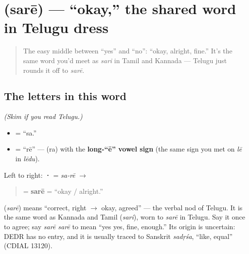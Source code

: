 \section[\texorpdfstring{\te{సరే} (sarē)}{సరే (sarē)}]{ (sarē) — \textquotedblleft{}okay,\textquotedblright{} the shared word in Telugu dress}

\label{lesson:TE-C01-sare}



\begin{quote}
The easy middle between \textquotedblleft{}yes\textquotedblright{} and \textquotedblleft{}no\textquotedblright{}: \textquotedblleft{}okay, alright, fine.\textquotedblright{} It's the same word you'd meet as \emph{sari} in Tamil and Kannada — Telugu just rounds it off to \emph{sarē}.
\end{quote}

\subsection*{The letters in this word}
\emph{(Skim if you read Telugu.)}

\begin{itemize}
\raggedright
  \item \textbf{} = \textquotedblleft{}sa.\textquotedblright{}
  \item \textbf{} = \textquotedblleft{}rē\textquotedblright{} — \textbf{} (ra) with the \textbf{long-\textquotedblleft{}ē\textquotedblright{} vowel sign} (the same sign you met on \emph{lē} in \emph{lēdu}).
\end{itemize}

Left to right: \textbf{ · } = \emph{sa-rē} $\to$

\begin{quote}
\textbf{} = \textbf{sarē} = \textquotedblleft{}okay / alright.\textquotedblright{}
\end{quote}

\begin{cousinweb}
\textbf{} (\emph{sarē}) means \textquotedblleft{}correct, right $\to$ okay, agreed\textquotedblright{} — the verbal nod of Telugu. It is the same word as Kannada \textbf{} and Tamil \textbf{} (\emph{sari}), worn to \emph{sarē} in Telugu. Say it once to agree; say \emph{sarē sarē} to mean \textquotedblleft{}yes yes, fine, enough.\textquotedblright{} Its origin is uncertain: DEDR has no entry, and it is usually traced to Sanskrit \emph{sadṛśa}, \textquotedblleft{}like, equal\textquotedblright{} (CDIAL 13120).
\end{cousinweb}

